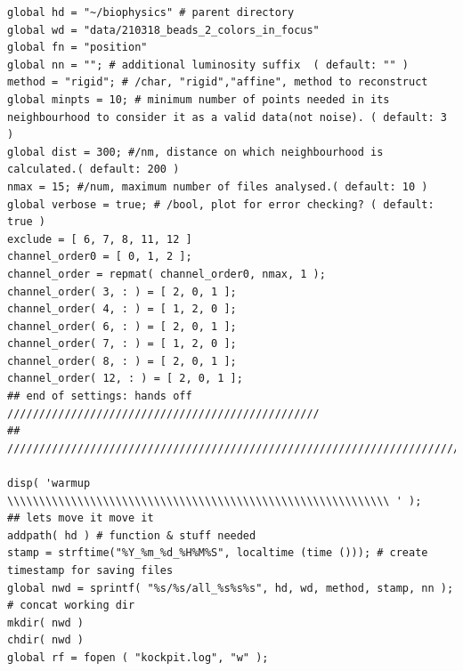 \documentclass[11pt, a4paper, oneside, twocolumn]{report}
\begin{document}
\begin{verbatim}
global hd = "~/biophysics" # parent directory
global wd = "data/210318_beads_2_colors_in_focus"
global fn = "position"
global nn = ""; # additional luminosity suffix  ( default: "" )
method = "rigid"; # /char, "rigid","affine", method to reconstruct
global minpts = 10; # minimum number of points needed in its neighbourhood to consider it as a valid data(not noise). ( default: 3 )
global dist = 300; #/nm, distance on which neighbourhood is calculated.( default: 200 )
nmax = 15; #/num, maximum number of files analysed.( default: 10 )
global verbose = true; # /bool, plot for error checking? ( default: true )
exclude = [ 6, 7, 8, 11, 12 ]
channel_order0 = [ 0, 1, 2 ];
channel_order = repmat( channel_order0, nmax, 1 );
channel_order( 3, : ) = [ 2, 0, 1 ];
channel_order( 4, : ) = [ 1, 2, 0 ];
channel_order( 6, : ) = [ 2, 0, 1 ];
channel_order( 7, : ) = [ 1, 2, 0 ];
channel_order( 8, : ) = [ 2, 0, 1 ];
channel_order( 12, : ) = [ 2, 0, 1 ];
## end of settings: hands off /////////////////////////////////////////////////
## ///////////////////////////////////////////////////////////////////////////

disp( 'warmup \\\\\\\\\\\\\\\\\\\\\\\\\\\\\\\\\\\\\\\\\\\\\\\\\\\\\\\\\\\\ ' );
## lets move it move it
addpath( hd ) # function & stuff needed
stamp = strftime("%Y_%m_%d_%H%M%S", localtime (time ())); # create timestamp for saving files
global nwd = sprintf( "%s/%s/all_%s%s%s", hd, wd, method, stamp, nn ); # concat working dir
mkdir( nwd )
chdir( nwd )
global rf = fopen ( "kockpit.log", "w" );


\end{verbatim}
\end{document}
